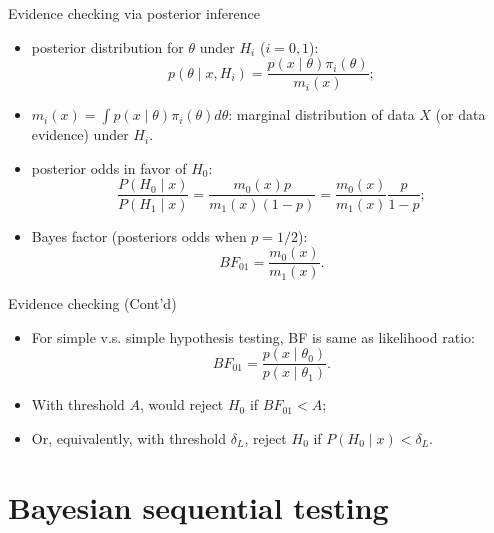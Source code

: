 \documentclass[xcolor=dvipsnames]{beamer}
\begin{document}
\begin{frame}{Evidence checking via posterior inference}
\begin{itemize}
    \item posterior distribution for $\theta$ under $H_i$ ($i=0,1$):
    \begin{equation}
    p(\theta \mid x, H_i) = \frac{p(x \mid \theta) \pi_i(\theta)}{m_i(x)};
    \end{equation}
    \item $m_i(x) = \int p(x \mid \theta) \pi_i(\theta) d\theta$: marginal distribution of data $X$ (or data evidence) under $H_i$. 
    \pause
    \item posterior odds in favor of $H_0$:
    \begin{equation}
    \frac{P(H_0 \mid x)}{P(H_1 \mid x)} = \frac{m_0(x) p}{m_1(x) (1-p)} = \frac{m_0(x)}{m_1(x)} \frac{p}{1-p};
    \end{equation}
    \pause
    \item Bayes factor (posteriors odds when $p=1/2$):
    \begin{equation}
    \label{eq:bayes-factor}
    BF_{01} = \frac{m_0(x)}{m_1(x)}.
    \end{equation}
\end{itemize}
    
\end{frame}

\begin{frame}{Evidence checking (Cont'd)}
\begin{itemize}
    \item For simple v.s. simple hypothesis testing, BF is same as likelihood ratio:
    \begin{equation}
    BF_{01} = \frac{p(x \mid \theta_0)}{p(x \mid \theta_1)}.
    \end{equation}
    \pause
    \item With threshold $A$, would reject $H_0$ if $BF_{01} < A$;
    \item Or, equivalently, with threshold $\delta_L$, reject $H_0$ if $P(H_0 \mid x) < \delta_L$.
\end{itemize}
\end{frame}

\section{Bayesian sequential testing}
\end{document}
